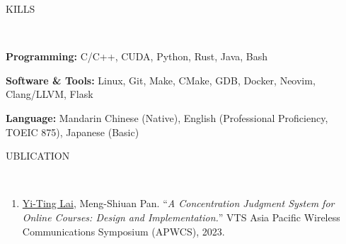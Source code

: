 \documentclass[11pt]{article}
\begin{document}

\newpage

\begin{center}
    \scalebox{1.3}{S}KILLS\raggedright \,\hrulefill
\end{center}
\textbf{Programming:} C/C++, CUDA, Python, Rust, Java, Bash

\textbf{Software \& Tools:}  Linux, Git, Make, CMake, GDB, Docker, Neovim, Clang/LLVM, Flask

\textbf{Language:} Mandarin Chinese (Native), English (Professional Proficiency, TOEIC 875), Japanese (Basic)

\begin{center}
    \scalebox{1.3}{P}UBLICATION\raggedright \,\hrulefill
\end{center}

\begin{enumerate}[noitemsep, topsep=0pt, partopsep=0pt, parsep=0pt, leftmargin=*]
    \item \underline{Yi-Ting Lai}, Meng-Shiuan Pan. ``\textit{A Concentration Judgment System for Online Courses: Design and Implementation.}'' VTS Asia Pacific Wireless Communications Symposium (APWCS), 2023.
\end{enumerate}
\end{document}
